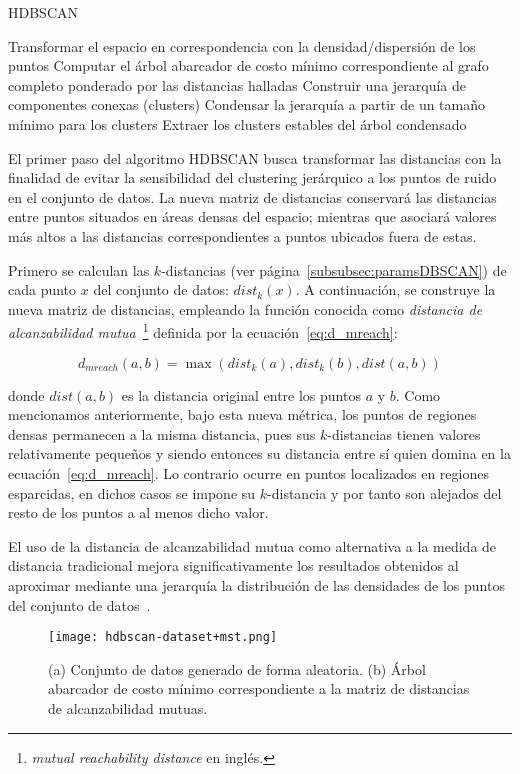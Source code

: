 \begin{algorithm}
    \caption{HDBSCAN}
    \label{algorithm:HDBSCAN}
    Transformar el espacio en correspondencia con la densidad/dispersión de los puntos\;
    Computar el árbol abarcador de costo mínimo correspondiente al grafo completo ponderado por las distancias halladas\;
    Construir una jerarquía de componentes conexas (clusters)\;
    Condensar la jerarquía a partir de un tamaño mínimo para los clusters\;
    Extraer los clusters estables del árbol condensado\;
\end{algorithm}

El primer paso del algoritmo HDBSCAN busca transformar las distancias con la finalidad de evitar la sensibilidad del clustering jerárquico a los puntos de ruido en el conjunto de datos.
La nueva matriz de distancias conservará las distancias entre puntos situados en áreas densas del espacio;
mientras que asociará valores más altos a las distancias correspondientes a puntos ubicados fuera de estas.

Primero se calculan las $k$-distancias (ver página~\ref{subsubsec:paramsDBSCAN}) de cada punto $x$ del conjunto de datos: $dist_k(x)$.
A continuación, se construye la nueva matriz de distancias, empleando la función conocida como \textit{distancia de alcanzabilidad mutua}~\footnote{\textit{mutual reachability distance} en inglés.} definida por la ecuación~\ref{eq:d_mreach}:

\begin{equation}
    \label{eq:d_mreach}
    d_{mreach}(a,b)=\max(dist_k(a), dist_k(b), dist(a,b))
\end{equation}

donde $dist(a,b)$ es la distancia original entre los puntos $a$ y $b$.
Como mencionamos anteriormente, bajo esta nueva métrica, los puntos de regiones densas permanecen a la misma distancia, pues sus $k$-distancias tienen valores relativamente pequeños y siendo entonces su distancia entre sí quien domina en la ecuación~\ref{eq:d_mreach}.
Lo contrario ocurre en puntos localizados en regiones esparcidas, en dichos casos se impone su $k$-distancia y por tanto son alejados del resto de los puntos a al menos dicho valor.

El uso de la distancia de alcanzabilidad mutua como alternativa a la medida de distancia tradicional mejora significativamente los resultados obtenidos al aproximar mediante una jerarquía la distribución de las densidades de los puntos del conjunto de datos~\cite{Eldridge15}.

\begin{figure}[!h]
    \centering
    \texttt{[image: hdbscan-dataset+mst.png]}
    \caption{(a) Conjunto de datos generado de forma aleatoria. (b) Árbol abarcador de costo mínimo correspondiente a la matriz de distancias de alcanzabilidad mutuas.}
    \label{img:hdbscan-dataset+mst}
\end{figure}

